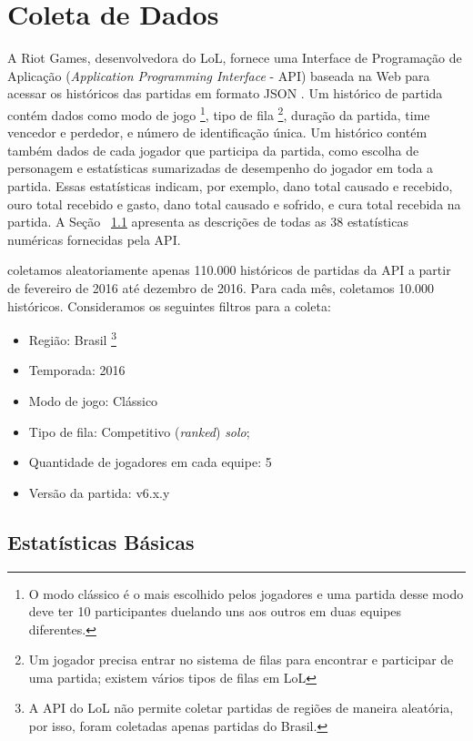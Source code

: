 \section{Coleta de Dados}
A Riot Games, desenvolvedora do LoL, fornece uma Interface de Programação de Aplicação (\textit{Application Programming Interface} - API) baseada na Web para acessar os históricos das partidas em formato JSON \cite{riot1}. Um histórico de partida contém dados como modo de jogo \footnote{O modo clássico é o mais escolhido pelos jogadores e uma partida desse modo deve ter 10 participantes duelando uns aos outros em duas equipes diferentes.}, tipo de fila \footnote{Um jogador precisa entrar no sistema de filas para encontrar e participar de uma partida; existem vários tipos de filas em LoL}, duração da partida, time vencedor e perdedor, e número de identificação única. Um histórico contém também dados de cada jogador que participa da partida, como escolha de personagem e estatísticas sumarizadas de desempenho do jogador em toda a partida. Essas estatísticas indicam, por exemplo, dano total causado e recebido, ouro total recebido e gasto, dano total causado e sofrido, e cura total recebida na partida. A Seção ~\ref{sec:features-desc} apresenta as descrições de todas as 38 estatísticas numéricas fornecidas pela API.

 coletamos aleatoriamente apenas 110.000 históricos de partidas da API a partir de fevereiro de 2016 até dezembro de 2016. Para cada mês, coletamos 10.000 históricos. Consideramos os seguintes filtros para a coleta: 

\begin{itemize}
  \item Região: Brasil \footnote{A API do LoL não permite coletar partidas de regiões de maneira aleatória, por isso, foram coletadas apenas partidas do Brasil.}
  \item Temporada: 2016
  \item Modo de jogo: Clássico
  \item Tipo de fila: Competitivo (\textit{ranked}) \textit{solo};
  \item Quantidade de jogadores em cada equipe: 5
  \item Versão da partida: v6.x.y
\end{itemize}

\subsection{Estatísticas Básicas} \label{sec:features-desc}

